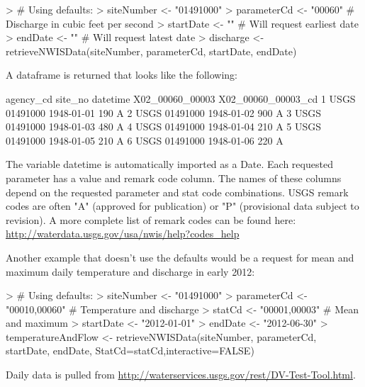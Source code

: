 \documentclass[a4paper,11pt]{article}
\begin{document}
\begin{Schunk}
\begin{Sinput}
> # Using defaults:
> siteNumber <- "01491000"
> parameterCd <- "00060"  # Discharge in cubic feet per second
> startDate <- ""  # Will request earliest date
> endDate <- "" # Will request latest date
> discharge <- retrieveNWISData(siteNumber, parameterCd, startDate, endDate)
\end{Sinput}
\end{Schunk}

A dataframe is returned that looks like the following:
\begin{Schunk}
\begin{Soutput}
  agency_cd  site_no   datetime X02_00060_00003 X02_00060_00003_cd
1      USGS 01491000 1948-01-01             190                  A
2      USGS 01491000 1948-01-02             900                  A
3      USGS 01491000 1948-01-03             480                  A
4      USGS 01491000 1948-01-04             210                  A
5      USGS 01491000 1948-01-05             210                  A
6      USGS 01491000 1948-01-06             220                  A
\end{Soutput}
\end{Schunk}

The variable datetime is automatically imported as a Date. Each requested parameter has a value and remark code column.  The names of these columns depend on the requested parameter and stat code combinations. USGS remark codes are often "A" (approved for publication) or "P" (provisional data subject to revision). A more complete list of remark codes can be found here:
\url{http://waterdata.usgs.gov/usa/nwis/help?codes_help}

Another example that doesn't use the defaults would be a request for mean and maximum daily temperature and discharge in early 2012:
\begin{Schunk}
\begin{Sinput}
> # Using defaults:
> siteNumber <- "01491000" 
> parameterCd <- "00010,00060"  # Temperature and discharge
> statCd <- "00001,00003"  # Mean and maximum
> startDate <- "2012-01-01"
> endDate <- "2012-06-30"
> temperatureAndFlow <- retrieveNWISData(siteNumber, parameterCd, 
                   startDate, endDate, StatCd=statCd,interactive=FALSE)
\end{Sinput}
\end{Schunk}

Daily data is pulled from \url{http://waterservices.usgs.gov/rest/DV-Test-Tool.html}. 
\end{document}
